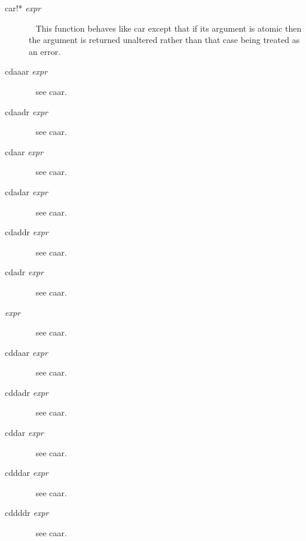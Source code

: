 \documentclass[a4paper,11pt]{article}
\begin{document}
\begin{description}
\item[{\ttfamily car!*} {\itshape expr}] ~\newline
This function behaves like {\ttfamily car} except that if its argument
is atomic then the argument is returned unaltered rather than that case
being treated as an error.

\item[{\ttfamily cdaaar} {\itshape expr}] ~\newline
see {\ttfamily caar}.

\item[{\ttfamily cdaadr} {\itshape expr}] ~\newline
see {\ttfamily caar}.

\item[{\ttfamily cdaar} {\itshape expr}] ~\newline
see {\ttfamily caar}.

\item[{\ttfamily cdadar} {\itshape expr}] ~\newline
see {\ttfamily caar}.

\item[{\ttfamily cdaddr} {\itshape expr}] ~\newline
see {\ttfamily caar}.

\item[{\ttfamily cdadr} {\itshape expr}] ~\newline
see {\ttfamily caar}.

\item[{\ttfamily} {\itshape expr}] ~\newline
see {\ttfamily caar}.

\item[{\ttfamily cddaar} {\itshape expr}] ~\newline
see {\ttfamily caar}.

\item[{\ttfamily cddadr} {\itshape expr}] ~\newline
see {\ttfamily caar}.

\item[{\ttfamily cddar} {\itshape expr}] ~\newline
see {\ttfamily caar}.

\item[{\ttfamily cdddar} {\itshape expr}] ~\newline
see {\ttfamily caar}.

\item[{\ttfamily cddddr} {\itshape expr}] ~\newline
see {\ttfamily caar}.


\end{description}
\end{document}
